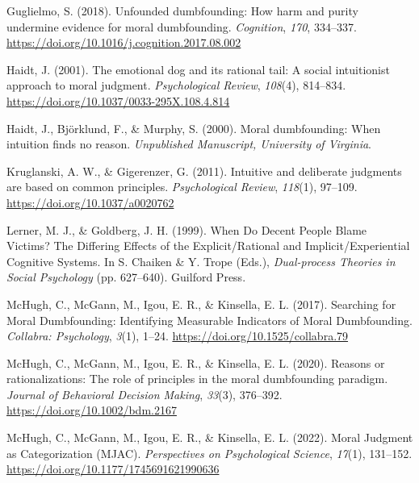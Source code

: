 \documentclass[
  man,floatsintext]{apa6}
\newlength{\cslhangindent}
\newlength{\cslentryspacingunit} %
\newenvironment{CSLReferences}[2] %
 {%
  \setlength{\parindent}{0pt}
  \ifodd #1
  \let\oldpar\par
  \def\par{\hangindent=\cslhangindent\oldpar}
  \fi
  \setlength{\parskip}{#2\cslentryspacingunit}
 }%
 {}
\begin{document}
\begin{CSLReferences}{1}{0}
\leavevmode{}%
Guglielmo, S. (2018). Unfounded dumbfounding: {How} harm and purity undermine evidence for moral dumbfounding. \emph{Cognition}, \emph{170}, 334--337. \url{https://doi.org/10.1016/j.cognition.2017.08.002}

\leavevmode{}%
Haidt, J. (2001). The emotional dog and its rational tail: {A} social intuitionist approach to moral judgment. \emph{Psychological Review}, \emph{108}(4), 814--834. \url{https://doi.org/10.1037/0033-295X.108.4.814}

\leavevmode{}%
Haidt, J., Björklund, F., \& Murphy, S. (2000). Moral dumbfounding: {When} intuition finds no reason. \emph{Unpublished Manuscript, University of Virginia}.

\leavevmode{}%
Kruglanski, A. W., \& Gigerenzer, G. (2011). Intuitive and deliberate judgments are based on common principles. \emph{Psychological Review}, \emph{118}(1), 97--109. \url{https://doi.org/10.1037/a0020762}

\leavevmode{}%
Lerner, M. J., \& Goldberg, J. H. (1999). When {Do Decent People Blame Victims}? {The Differing Effects} of the {Explicit}/{Rational} and {Implicit}/{Experiential Cognitive Systems}. In S. Chaiken \& Y. Trope (Eds.), \emph{Dual-process {Theories} in {Social Psychology}} (pp. 627--640). {Guilford Press}.

\leavevmode{}%
McHugh, C., McGann, M., Igou, E. R., \& Kinsella, E. L. (2017). Searching for {Moral Dumbfounding}: {Identifying Measurable Indicators} of {Moral Dumbfounding}. \emph{Collabra: Psychology}, \emph{3}(1), 1--24. \url{https://doi.org/10.1525/collabra.79}

\leavevmode{}%
McHugh, C., McGann, M., Igou, E. R., \& Kinsella, E. L. (2020). Reasons or rationalizations: {The} role of principles in the moral dumbfounding paradigm. \emph{Journal of Behavioral Decision Making}, \emph{33}(3), 376--392. \url{https://doi.org/10.1002/bdm.2167}

\leavevmode{}%
McHugh, C., McGann, M., Igou, E. R., \& Kinsella, E. L. (2022). Moral {Judgment} as {Categorization} ({MJAC}). \emph{Perspectives on Psychological Science}, \emph{17}(1), 131--152. \url{https://doi.org/10.1177/1745691621990636}


\end{CSLReferences}
\end{document}
